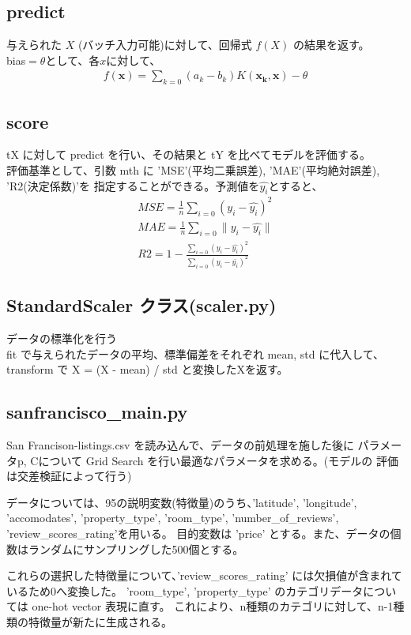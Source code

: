 \documentclass{jsarticle}
\begin{document}
\subsection*{predict}
与えられた $X$ (バッチ入力可能)に対して、回帰式 $f(X)$ の結果を返す。\\
bias$ = \theta$として、各$x$に対して、
\begin{eqnarray*}
f(\bm{x}) = \sum_{k=0} (a_k - b_k) K(\bm{x_k}, \bm{x}) - \theta
\end{eqnarray*}

\subsection*{score}
tX に対して predict を行い、その結果と tY を比べてモデルを評価する。\\
評価基準として、引数 mth に 'MSE'(平均二乗誤差), 'MAE'(平均絶対誤差), 'R2(決定係数)'を
指定することができる。予測値を$\hat{y_i}$とすると、
\begin{eqnarray*}
MSE = \frac{1}{n} \sum_{i=0} (y_i - \hat{y_i})^2 \\
MAE = \frac{1}{n} \sum_{i=0} \| y_i - \hat{y_i} \| \\
R2 = 1 - \frac{\sum_{i=0} (y_i - \hat{y_i})^2}{\sum_{i=0} (y_i - \bar{y_i})^2}
\end{eqnarray*}

\subsection*{StandardScaler クラス(scaler.py)}
データの標準化を行う \\
fit で与えられたデータの平均、標準偏差をそれぞれ mean, std に代入して、
transform で X = (X - mean) / std と変換したXを返す。

\subsection*{sanfrancisco\_main.py}
San Francison-listings.csv を読み込んで、データの前処理を施した後に
パラメータp, Cについて Grid Search を行い最適なパラメータを求める。(モデルの
評価は交差検証によって行う)

データについては、95の説明変数(特徴量)のうち、'latitude', 'longitude', 'accomodates', 'property\_type', 
'room\_type', 'number\_of\_reviews', 'review\_scores\_rating'を用いる。
目的変数は 'price' とする。また、データの個数はランダムにサンプリングした500個とする。

これらの選択した特徴量について、'review\_scores\_rating' には欠損値が含まれているため0へ変換した。
'room\_type', 'property\_type' のカテゴリデータについては one-hot vector 表現に直す。
これにより、n種類のカテゴリに対して、n-1種類の特徴量が新たに生成される。
\end{document}

